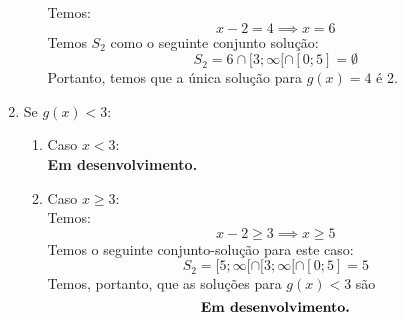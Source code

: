 \begin{enumerate}
\begin{enumerate}
                Temos:
                \begin{displaymath}
                    x - 2 = 4 \implies x = 6
                \end{displaymath}
                Temos $S_2$ como o seguinte conjunto solução:
                \begin{displaymath}
                    S_2 = 6 \cap [3; \infty[ \cap [0; 5] = \emptyset
                \end{displaymath}
                Portanto, temos que a única solução para $g(x) = 4$ é 2.
            \end{enumerate}
        \item Se $g(x) < 3$:
        \begin{enumerate}
            \item Caso $x < 3$: \\
            \textbf{Em desenvolvimento.}
            \item Caso $x \ge 3$: \\
            Temos: 
            \begin{displaymath}
                x - 2 \ge 3 \implies x \ge 5
            \end{displaymath}
            Temos o seguinte conjunto-solução para este caso:
            \begin{displaymath}
                S_2 = [5; \infty[ \cap [3; \infty[ \cap [0; 5] = 5
            \end{displaymath}
            Temos, portanto, que as soluções para $g(x) < 3$ são
            \begin{displaymath}
                \text{\textbf{Em desenvolvimento.}}
            \end{displaymath}
        \end{enumerate}
    \end{enumerate}